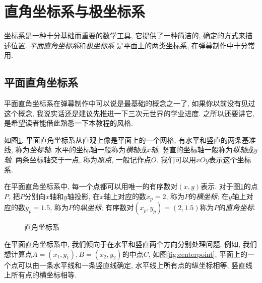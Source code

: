 \section{直角坐标系与极坐标系} \label{sec:coord}

坐标系是一种十分基础而重要的数学工具,
它提供了一种简洁的, 确定的方式来描述位置.
\emph{平面直角坐标系}和\emph{极坐标系}
是平面上的两类坐标系, 在弹幕制作中十分常用.

\subsection{平面直角坐标系}

平面直角坐标系在弹幕制作中可以说是最基础的概念之一了,
如果你以前没有见过这个概念,
我说实话还是建议先推进一下三次元世界的学业进度.
之所以还要讲它, 是希望读者能借此熟悉一下本教程的风格.

如图\ref{fig:xy-coord-sys},
平面直角坐标系从直观上像是平面上的一个网格,
有水平和竖直的两条基准线, 称为\emph{坐标轴}.
水平的坐标轴一般称为\emph{横轴}或\emph{$x$轴},
竖直的坐标轴一般称为\emph{纵轴}或\emph{$y$轴}.
两条坐标轴交于一点, 称为\emph{原点}, 一般记作点$O$.
我们可以用$xOy$表示这个坐标系.

在平面直角坐标系中, 每一个点都可以用唯一的有序数对$(x,y)$表示.
对于图\ref{fig:xy-coord-sys}的点$P$,
把$P$分别向$x$轴和$y$轴投影,
在$x$轴上对应的数$x_p = 2$, 称为$P$的\emph{横坐标};
在$y$轴上对应的数$y_p = 1.5$, 称为$P$的\emph{纵坐标};
有序数对$(x_p,y_p) = (2,1.5)$称为$P$的\emph{直角坐标}.

\begin{figure}[htbp]
  \centering
  \caption{直角坐标系}
  \label{fig:xy-coord-sys}
\end{figure}

在平面直角坐标系中, 我们倾向于在水平和竖直两个方向分别处理问题.
例如, 我们想计算点$A=(x_1,y_1), B=(x_2,y_2)$的中点$C$,
如图\ref{fig:centerpoint},
平面上的一个点可以由一条水平线和一条竖直线确定,
水平线上所有点的纵坐标相等, 竖直线上所有点的横坐标相等.

